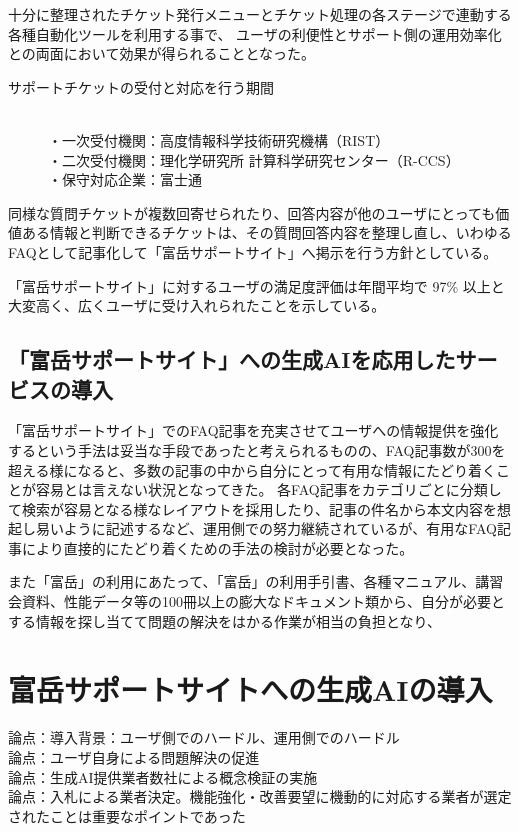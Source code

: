 \documentclass{jsaxiesproc}
\begin{document}
十分に整理されたチケット発行メニューとチケット処理の各ステージで連動する各種自動化ツールを利用する事で、
ユーザの利便性とサポート側の運用効率化との両面において効果が得られることとなった。

\begin{description}
\item[サポートチケットの受付と対応を行う期間]\mbox{}\\
・一次受付機関：高度情報科学技術研究機構（RIST）\\
・二次受付機関：理化学研究所 計算科学研究センター（R-CCS）\\
・保守対応企業：富士通
\end{description}


同様な質問チケットが複数回寄せられたり、回答内容が他のユーザにとっても価値ある情報と判断できるチケットは、その質問回答内容を整理し直し、いわゆるFAQとして記事化して「富岳サポートサイト」へ掲示を行う方針としている。

「富岳サポートサイト」に対するユーザの満足度評価は年間平均で 97\% 以上と大変高く、広くユーザに受け入れられたことを示している。



\subsection{「富岳サポートサイト」への生成AIを応用したサービスの導入}

「富岳サポートサイト」でのFAQ記事を充実させてユーザへの情報提供を強化するという手法は妥当な手段であったと考えられるものの、FAQ記事数が300を超える様になると、多数の記事の中から自分にとって有用な情報にたどり着くことが容易とは言えない状況となってきた。
各FAQ記事をカテゴリごとに分類して検索が容易となる様なレイアウトを採用したり、記事の件名から本文内容を想起し易いように記述するなど、運用側での努力継続されているが、有用なFAQ記事により直接的にたどり着くための手法の検討が必要となった。


また「富岳」の利用にあたって、「富岳」の利用手引書、各種マニュアル、講習会資料、性能データ等の100冊以上の膨大なドキュメント類から、自分が必要とする情報を探し当てて問題の解決をはかる作業が相当の負担となり、

\section{富岳サポートサイトへの生成AIの導入}

論点：導入背景：ユーザ側でのハードル、運用側でのハードル\\
論点：ユーザ自身による問題解決の促進\\
論点：生成AI提供業者数社による概念検証の実施\\
論点：入札による業者決定。機能強化・改善要望に機動的に対応する業者が選定されたことは重要なポイントであった\\
\end{document}
